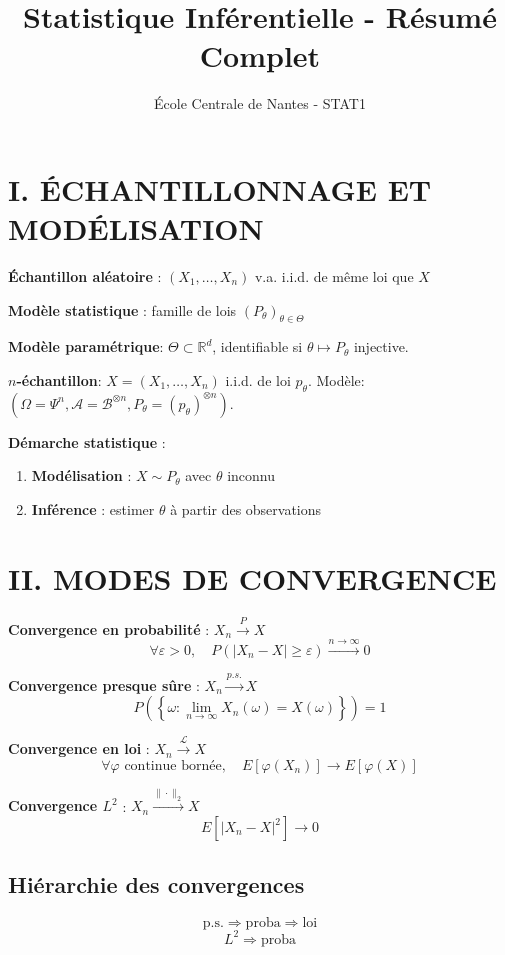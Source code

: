 \documentclass[8pt,twocolumn]{article}
\newcommand{\mydef}[1]{\textcolor{defcolor}{\textbf{#1}}}
\newcommand{\myprop}[1]{\textcolor{propcolor}{\textbf{#1}}}
\newcommand{\R}{\mathbb{R}}
\begin{document}
\title{\textbf{Statistique Inférentielle - Résumé Complet}}
\author{École Centrale de Nantes - STAT1}
\date{}
\maketitle

\section*{\mydef{I. ÉCHANTILLONNAGE ET MODÉLISATION}}

\textbf{Échantillon aléatoire} : $(X_1,\ldots,X_n)$ v.a. i.i.d. de même loi que $X$

\textbf{Modèle statistique} : famille de lois $(P_\theta)_{\theta \in \Theta}$

\mydef{Modèle paramétrique}: $\Theta \subset \R^d$, identifiable si $\theta \mapsto P_\theta$ injective.

\mydef{$n$-échantillon}: $X=(X_1,\dots,X_n)$ i.i.d. de loi $p_\theta$. Modèle: $(\Omega=\Psi^n, \mathcal{A}=\mathcal{B}^{\otimes n}, P_\theta=(p_\theta)^{\otimes n})$.

\textbf{Démarche statistique} :
\begin{enumerate}[nosep]
\item \mydef{Modélisation} : $X \sim P_\theta$ avec $\theta$ inconnu
\item \mydef{Inférence} : estimer $\theta$ à partir des observations
\end{enumerate}

\section*{\mydef{II. MODES DE CONVERGENCE}}

\textbf{Convergence en probabilité} : $X_n \xrightarrow{P} X$
$$\forall \varepsilon > 0, \quad P(|X_n - X| \geq \varepsilon) \xrightarrow{n \to \infty} 0$$

\textbf{Convergence presque sûre} : $X_n \xrightarrow{p.s.} X$
$$P\left(\left\{\omega : \lim_{n \to \infty} X_n(\omega) = X(\omega)\right\}\right) = 1$$

\textbf{Convergence en loi} : $X_n \xrightarrow{\mathcal{L}} X$
$$\forall \varphi \text{ continue bornée}, \quad E[\varphi(X_n)] \to E[\varphi(X)]$$

\textbf{Convergence $L^2$} : $X_n \xrightarrow{\|\cdot\|_2} X$
$$E[|X_n - X|^2] \to 0$$

\subsection{\myprop{Hiérarchie des convergences}}
$$\text{p.s.} \Rightarrow \text{proba} \Rightarrow \text{loi}$$
$$L^2 \Rightarrow \text{proba}$$
\end{document}
